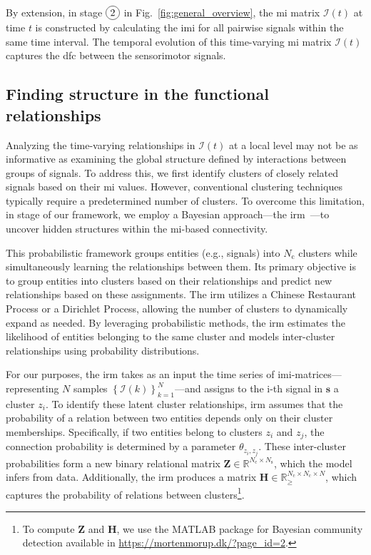By extension, in stage $\circled{2}$ in Fig.~\ref{fig:general_overview}, the \ac{mi} matrix $\bm{\mathcal{I}}(t)$ at time $t$ is constructed by calculating the \ac{imi} for all pairwise signals within the same time interval. The temporal evolution of this time-varying \ac{mi} matrix $\bm{\mathcal{I}}(t)$ captures the \ac{dfc} between the sensorimotor signals.

\subsection{Finding structure in the functional relationships}\label{sec:the_irm}
Analyzing the time-varying relationships in $\bm{\mathcal{I}}(t)$ at a local level may not be as informative as examining the global structure defined by interactions between groups of signals. To address this, we first identify clusters of closely related signals based on their \ac{mi} values. However, conventional clustering techniques typically require a predetermined number of clusters. To overcome this limitation, in stage  of our framework, we employ a Bayesian approach---the \ac{irm}~\cite{Moerup2012}---to uncover hidden structures within the \ac{mi}-based connectivity.

This probabilistic framework groups entities (e.g., signals) into $N_\text{c}$ clusters while simultaneously learning the relationships between them. Its primary objective is to group entities into clusters based on their relationships and predict new relationships based on these assignments. The \ac{irm} utilizes a Chinese Restaurant Process or a Dirichlet Process, allowing the number of clusters to dynamically expand as needed. By leveraging probabilistic methods, the \ac{irm} estimates the likelihood of entities belonging to the same cluster and models inter-cluster relationships using probability distributions.

For our purposes, the \ac{irm} takes as an input the time series of  \ac{imi}-matrices---representing $N$ samples $\left\lbrace \bm{\mathcal{I}}(k)\right\rbrace^{N}_{k=1}$---and assigns to the i-th signal in $\bm{s}$ a cluster $z_i$. To identify these latent cluster relationships, \ac{irm} assumes that the probability of a relation between two entities depends only on their cluster memberships. Specifically, if two entities belong to clusters $z_i$ and $z_j$, the connection probability is determined by a parameter $\theta_{z_i,z_j}$. These inter-cluster probabilities form a new binary relational matrix $\bm{Z}\in \mathbb{R}^{N_\text{c}\times N_\text{s}}$, which the model infers from data. Additionally, the \ac{irm} produces a matrix $\bm{H}\in \mathbb{R}^{N_\text{c}\times N_\text{c} \times N}_{\geq}$, which captures the probability of relations between clusters\footnote{To compute $\bm{Z}$ and $\bm{H}$, we use the MATLAB package for Bayesian community detection
available in \url{https://mortenmorup.dk/?page_id=2}.}.

